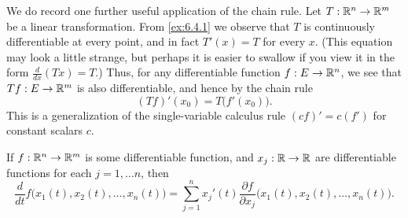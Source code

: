 \begin{note}
  We do record one further useful application of the chain rule.
  Let \(T : \mathbb{R}^n \to \mathbb{R}^m\) be a linear transformation.
  From \cref{ex:6.4.1} we observe that \(T\) is continuously differentiable at every point, and in fact \(T'(x) = T\) for every \(x\).
  (This equation may look a little strange, but perhaps it is easier to swallow if you view it in the form \(\frac{d}{dx} (Tx) = T\).)
  Thus, for any differentiable function \(f : E \to \mathbb{R}^n\), we see that \(T f : E \to \mathbb{R}^m\) is also differentiable, and hence by the chain rule
  \[
    (T f)'(x_0) = T\big(f'(x_0)\big).
  \]
  This is a generalization of the single-variable calculus rule \((cf)' = c(f')\) for constant scalars \(c\).
\end{note}

\begin{ac}\label{ac:6.4.1}
  If \(f : \mathbb{R}^n \to \mathbb{R}^m\) is some differentiable function, and \(x_j : \mathbb{R} \to \mathbb{R}\) are differentiable functions for each \(j = 1, \dots n\), then
  \[
    \frac{d}{dt} f\big(x_1(t), x_2(t), \dots, x_n(t)\big) = \sum_{j = 1}^n x_j'(t) \frac{\partial f}{\partial x_j} \big(x_1(t), x_2(t), \dots, x_n(t)\big).
  \]
\end{ac}


